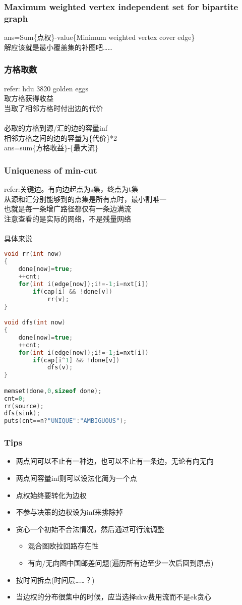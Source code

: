 \subsubsection{Maximum weighted vertex independent set for bipartite graph}
ans=Sum\{点权\}-value\{Minimum weighted vertex cover edge\}\\
解应该就是最小覆盖集的补图吧……
\subsubsection{方格取数}
refer: hdu 3820 golden eggs\\
取方格获得收益\\
当取了相邻方格时付出边的代价\\
\\
必取的方格到源/汇的边的容量inf\\
相邻方格之间的边的容量为\{代价\}*2\\
ans=sum\{方格收益\}-\{最大流\}
\subsubsection{Uniqueness of min-cut}
refer:关键边。有向边起点为s集，终点为t集\\
从源和汇分别能够到的点集是所有点时，最小割唯一\\
也就是每一条增广路径都仅有一条边满流\\
注意查看的是实际的网络，不是残量网络\\
\\
具体来说
\begin{lstlisting}[language=C++]
void rr(int now)
{
    done[now]=true;
    ++cnt;
    for(int i(edge[now]);i!=-1;i=nxt[i])
        if(cap[i] && !done[v])
            rr(v);
}

void dfs(int now)
{
    done[now]=true;
    ++cnt;
    for(int i(edge[now]);i!=-1;i=nxt[i])
        if(cap[i^1] && !done[v])
            dfs(v);
}

memset(done,0,sizeof done);
cnt=0;
rr(source);
dfs(sink);
puts(cnt==n?"UNIQUE":"AMBIGUOUS");
\end{lstlisting}
\subsubsection{Tips}
\begin{itemize}
\item 两点间可以不止有一种边，也可以不止有一条边，无论有向无向
\item 两点间容量inf则可以设法化简为一个点
\item 点权始终要转化为边权
\item 不参与决策的边权设为inf来排除掉
\item 贪心一个初始不合法情况，然后通过可行流调整
\begin{itemize}
\item 混合图欧拉回路存在性
\item 有向/无向图中国邮差问题(遍历所有边至少一次后回到原点)
\end{itemize}
\item 按时间拆点(时间层……？)
\item 当边权的分布很集中的时候，应当选择zkw费用流而不是ek贪心
\end{itemize}
